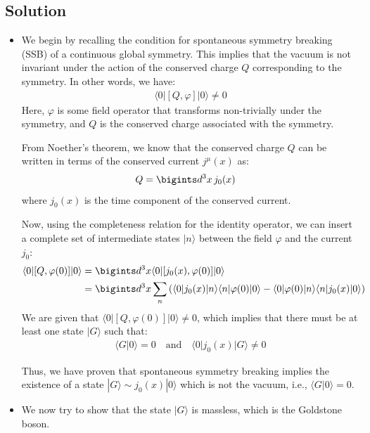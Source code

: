 \subsection*{Solution}
\begin{itemize}
    \item We begin by recalling the condition for spontaneous symmetry breaking (SSB) of a continuous global symmetry. This implies that the vacuum is not invariant under the action of the conserved charge $Q$ corresponding to the symmetry. In other words, we have:
\begin{align}
    \langle 0 | [Q, \varphi] | 0 \rangle \neq 0
\end{align}
Here, $\varphi$ is some field operator that transforms non-trivially under the symmetry, and $Q$ is the conserved charge associated with the symmetry.

From Noether's theorem, we know that the conserved charge $Q$ can be written in terms of the conserved current $j^\mu(x)$ as:
\begin{align}
    Q &= \bigints d^3 x \, j_0(x)
\end{align}
where $j_0(x)$ is the time component of the conserved current.

Now, using the completeness relation for the identity operator, we can insert a complete set of intermediate states $|n\rangle$ between the field $\varphi$ and the current $j_0$:
\begin{align}
    \langle 0 | [Q, \varphi(0)] | 0 \rangle &= \bigints d^3 x \langle 0 | [j_0(x), \varphi(0)] | 0 \rangle \\
    &= \bigints d^3 x \sum_n \left( \langle 0 | j_0(x) | n \rangle \langle n | \varphi(0) | 0 \rangle - \langle 0 | \varphi(0) | n \rangle \langle n | j_0(x) | 0 \rangle \right)
\end{align}
We are given that $\langle 0 | [Q, \varphi(0)] | 0 \rangle \neq 0$, which implies that there must be at least one state $|G\rangle$ such that:
\begin{align}
    \langle G | 0 \rangle = 0 \quad \text{and} \quad \langle 0 | j_0(x) | G \rangle \neq 0
\end{align}

Thus, we have proven that spontaneous symmetry breaking implies the existence of a state $|G\rangle \sim j_0(x) | 0 \rangle$ which is not the vacuum, i.e., $\langle G | 0 \rangle = 0$.

\item We now try to show that the state $|G\rangle$ is massless, which is the Goldstone boson.


\end{itemize}
